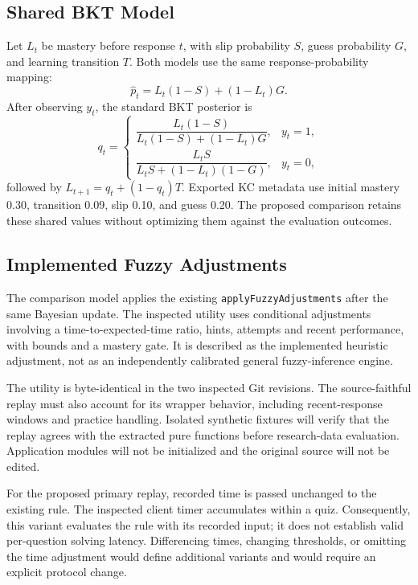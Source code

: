 \documentclass[conference]{IEEEtran}
\begin{document}
\subsection{Shared BKT Model}
Let $L_t$ be mastery before response $t$, with slip probability $S$, guess probability $G$, and learning transition $T$. Both models use the same response-probability mapping:
\begin{equation}
\widehat p_t=L_t(1-S)+(1-L_t)G.
\label{eq:predict}
\end{equation}
After observing $y_t$, the standard BKT posterior is
\begin{equation}
q_t=\begin{cases}
\dfrac{L_t(1-S)}{L_t(1-S)+(1-L_t)G},& y_t=1,\\[6pt]
\dfrac{L_tS}{L_tS+(1-L_t)(1-G)},& y_t=0,
\end{cases}
\end{equation}
followed by $L_{t+1}=q_t+(1-q_t)T$. Exported KC metadata use initial mastery 0.30, transition 0.09, slip 0.10, and guess 0.20. The proposed comparison retains these shared values without optimizing them against the evaluation outcomes.

\subsection{Implemented Fuzzy Adjustments}
The comparison model applies the existing \texttt{applyFuzzyAdjustments} after the same Bayesian update. The inspected utility uses conditional adjustments involving a time-to-expected-time ratio, hints, attempts and recent performance, with bounds and a mastery gate. It is described as the implemented heuristic adjustment, not as an independently calibrated general fuzzy-inference engine.

The utility is byte-identical in the two inspected Git revisions. The source-faithful replay must also account for its wrapper behavior, including recent-response windows and practice handling. Isolated synthetic fixtures will verify that the replay agrees with the extracted pure functions before research-data evaluation. Application modules will not be initialized and the original source will not be edited.

For the proposed primary replay, recorded time is passed unchanged to the existing rule. The inspected client timer accumulates within a quiz. Consequently, this variant evaluates the rule with its recorded input; it does not establish valid per-question solving latency. Differencing times, changing thresholds, or omitting the time adjustment would define additional variants and would require an explicit protocol change.
\end{document}
